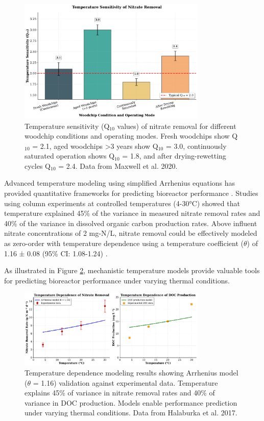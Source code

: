 \documentclass[12pt,a4paper]{article}
\begin{document}
\begin{figure}[ht]
\centering
\includegraphics[width=0.8\textwidth]{fig4_temperature_scientific}
\caption{Temperature sensitivity (Q$_{10}$ values) of nitrate removal for different woodchip conditions and operating modes. Fresh woodchips show Q$_{10}$ = 2.1, aged woodchips >3 years show Q$_{10}$ = 3.0, continuously saturated operation shows Q$_{10}$ = 1.8, and after drying-rewetting cycles Q$_{10}$ = 2.4. Data from Maxwell et al. 2020.}
\label{fig:temperature_sensitivity}
\end{figure}

Advanced temperature modeling using simplified Arrhenius equations has provided quantitative frameworks for predicting bioreactor performance \citep{RN242}. Studies using column experiments at controlled temperatures (4-30°C) showed that temperature explained 45\% of the variance in measured nitrate removal rates and 40\% of the variance in dissolved organic carbon production rates. Above influent nitrate concentrations of 2 mg-N/L, nitrate removal could be effectively modeled as zero-order with temperature dependence using a temperature coefficient ($\theta$) of 1.16 ± 0.08 (95\% CI: 1.08-1.24) \citep{RN242}.

As illustrated in Figure \ref{fig:temperature_modeling}, mechanistic temperature models provide valuable tools for predicting bioreactor performance under varying thermal conditions.

\begin{figure}[ht]
\centering
\includegraphics[width=0.8\textwidth]{fig10_temperature_modeling_scientific}
\caption{Temperature dependence modeling results showing Arrhenius model ($\theta$ = 1.16) validation against experimental data. Temperature explains 45\% of variance in nitrate removal rates and 40\% of variance in DOC production. Models enable performance prediction under varying thermal conditions. Data from Halaburka et al. 2017.}
\label{fig:temperature_modeling}
\end{figure}
\end{document}
